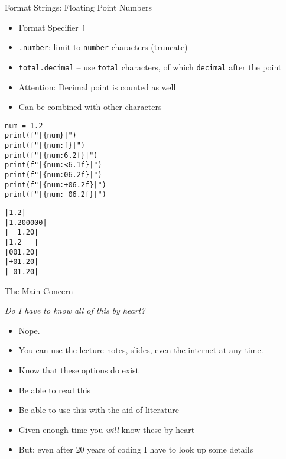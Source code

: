 \begin{frame}[fragile]{Format Strings: Floating Point Numbers}
%
\begin{itemize}
\item Format Specifier \texttt{f}
\item \texttt{.number}: limit to \texttt{number} characters (truncate)
\item \texttt{total.decimal} -- use \texttt{total} characters, of which \texttt{decimal} after the point
\item Attention: Decimal point is counted as well
\item Can be combined with other characters
\end{itemize}

\vspace{6pt}
\begin{codebox}[Code: Format Strings (4), width=.49\linewidth, nobeforeafter, equal height group = grpFormatString4]
\begin{verbatim}
num = 1.2
print(f"|{num}|")
print(f"|{num:f}|")
print(f"|{num:6.2f}|")
print(f"|{num:<6.1f}|")
print(f"|{num:06.2f}|")
print(f"|{num:+06.2f}|")
print(f"|{num: 06.2f}|")
\end{verbatim}
\end{codebox}
%
\begin{cmdbox}[Output: Format Strings (4), width=.49\linewidth, nobeforeafter, equal height group = grpFormatString4]
\begin{verbatim}
|1.2|
|1.200000|
|  1.20|
|1.2   |
|001.20|
|+01.20|
| 01.20|
\end{verbatim}
\end{cmdbox}
%
\end{frame}


\begin{frame}{The Main Concern}
%
\begin{center}
\begin{Large}
\emph{Do I have to know all of this by heart?}
\end{Large}
\end{center}
%
\begin{itemize}
\item Nope.
\item You can use the lecture notes, slides, even the internet at any time.
\item Know that these options do exist
\item Be able to read this
\item Be able to use this with the aid of literature
\item Given enough time you \emph{will} know these by heart
\item But: even after 20 years of coding I have to look up some details
\end{itemize}
%
\end{frame}

